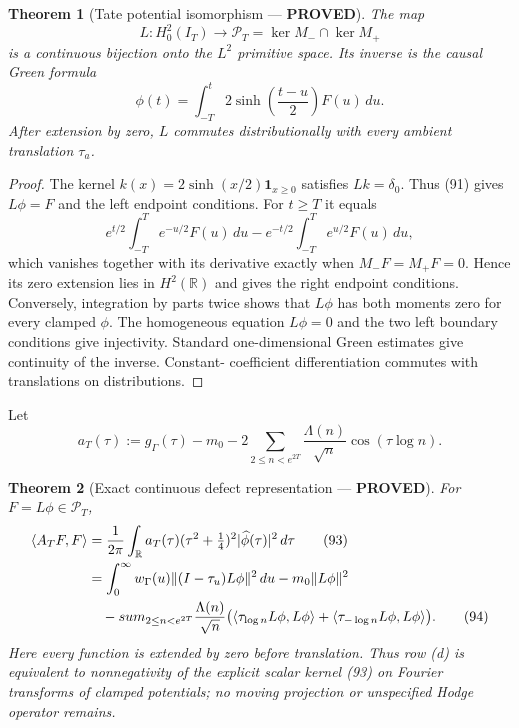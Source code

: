 \documentclass[11pt]{article}
\newtheorem{theorem}{Theorem}
\newcommand{\PROVED}{\textcolor{green!45!black}{\textbf{PROVED}}}
\begin{document}
\begin{theorem}[Tate potential isomorphism --- \PROVED]
The map
\begin{equation}
 L:H_0^2(I_T)\longrightarrow
 \mathcal P_T=\ker M_-\cap\ker M_+                 \tag{90}
\end{equation}
is a continuous bijection onto the $L^2$ primitive space.  Its inverse is
the causal Green formula
\begin{equation}
 \phi(t)=\int_{-T}^{t}2\sinh\!\left(\frac{t-u}{2}\right)F(u)\,du.
                                                               \tag{91}
\end{equation}
After extension by zero, $L$ commutes distributionally with every ambient
translation $\tau_a$.
\end{theorem}

\begin{proof}
The kernel $k(x)=2\sinh(x/2)\mathbf1_{x\ge0}$ satisfies $Lk=\delta_0$.
Thus (91) gives $L\phi=F$ and the left endpoint conditions.  For $t\ge T$ it
equals
\[
 e^{t/2}\int_{-T}^{T}e^{-u/2}F(u)\,du
 -e^{-t/2}\int_{-T}^{T}e^{u/2}F(u)\,du,
\]
which vanishes together with its derivative exactly when $M_-F=M_+F=0$.
Hence its zero extension lies in $H^2(\mathbb R)$ and gives the right endpoint
conditions.  Conversely, integration by parts twice shows that $L\phi$ has
both moments zero for every clamped $\phi$.  The homogeneous equation
$L\phi=0$ and the two left boundary conditions give injectivity.  Standard
one-dimensional Green estimates give continuity of the inverse.  Constant-
coefficient differentiation commutes with translations on distributions.
\end{proof}

Let
\begin{equation}
 a_T(\tau):=g_\Gamma(\tau)-m_0
 -2\sum_{2\le n<e^{2T}}\frac{\Lambda(n)}{\sqrt n}
        \cos(\tau\log n).                              \tag{92}
\end{equation}

\begin{theorem}[Exact continuous defect representation --- \PROVED]
For $F=L\phi\in\mathcal P_T$,
\begin{align}
 \langle A_TF,F\rangle
 &=\frac1{2\pi}\int_{\mathbb R}
       a_T(\tau)(\tau^2+\tfrac14)^2
       |\widehat\phi(\tau)|^2\,d\tau                 \tag{93}\\
 &=\int_0^\infty w_\Gamma(u)
       \|(I-\tau_u)L\phi\|^2\,du
   -m_0\|L\phi\|^2 \notag\\
 &\quad-sum_{2\le n<e^{2T}}\frac{\Lambda(n)}{\sqrt n}
       \bigl(\langle\tau_{\log n}L\phi,L\phi\rangle
             +\langle\tau_{-\log n}L\phi,L\phi\rangle\bigr). \tag{94}
\end{align}
Here every function is extended by zero before translation.  Thus row (d)
is equivalent to nonnegativity of the explicit scalar kernel (93) on Fourier
transforms of clamped potentials; no moving projection or unspecified Hodge
operator remains.
\end{theorem}
\end{document}

